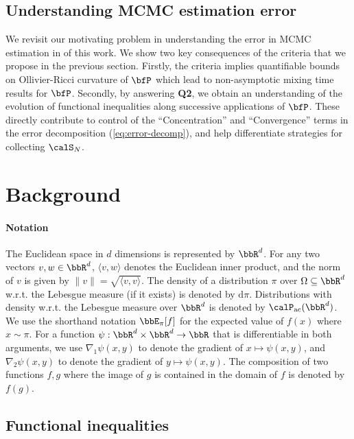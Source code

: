 \documentclass[11pt]{article}
\newcounter{ct}
\newcommand{\rmd}{\mathrm{d}}
\begin{document}
\subsection{Understanding MCMC estimation error}

We revisit our motivating problem in understanding the error in MCMC estimation in  of this work.
We show two key consequences of the criteria that we propose in the previous section.
Firstly, the criteria implies quantifiable bounds on Ollivier-Ricci curvature of \(\bfP\) \citep{ollivier2009ricci} which lead to non-asymptotic mixing time results for \(\bfP\).
Secondly, by answering \textbf{Q2}, we obtain an understanding of the evolution of functional inequalities along successive applications of \(\bfP\).
These directly contribute to control of the ``Concentration'' and ``Convergence'' terms in the error decomposition (\cref{eq:error-decomp}), and help differentiate strategies for collecting \(\calS_{N}\).
\section{Background}

\paragraph{Notation}
The Euclidean space in \(d\) dimensions is represented by \(\bbR^{d}\).
For any two vectors \(v, w \in \bbR^{d}\), \(\langle v, w\rangle\) denotes the Euclidean inner product, and the norm of \(v\) is given by \(\|v\| = \sqrt{\langle v, v\rangle}\).
The density of a distribution \(\pi\) over \(\Omega \subseteq \bbR^{d}\) w.r.t. the Lebesgue measure (if it exists) is denoted by \(\rmd\pi\).
Distributions with density w.r.t. the Lebesgue measure over \(\bbR^{d}\) is denoted by \(\calP_{\mathrm{ac}}(\bbR^{d})\).
We use the shorthand notation \(\bbE_{\pi}[f]\) for the expected value of \(f(x)\) where \(x \sim \pi\).
For a function \(\psi : \bbR^{d} \times \bbR^{d} \to \bbR\)  that is differentiable in both arguments, we use \(\nabla_{1}\psi(x, y)\) to denote the gradient of \(x \mapsto \psi(x, y)\), and \(\nabla_{2}\psi(x, y)\) to denote the gradient of \(y \mapsto \psi(x, y)\).
The composition of two functions \(f, g\) where the image of \(g\) is contained in the domain of \(f\) is denoted by \(f(g)\).

\subsection{Functional inequalities}
\end{document}

